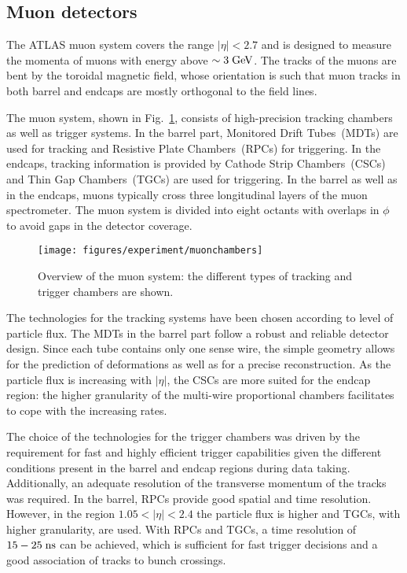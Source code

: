 \subsection{Muon detectors}
\label{sec:muonspectrometer}

The ATLAS muon system covers the range \mbox{$|\eta| < 2.7$}
and is designed to measure the momenta of muons with energy 
above \mbox{$\sim 3 \; \mathrm{GeV}$}.
The tracks of the muons are bent by the toroidal magnetic field,
whose orientation is such that muon tracks in both barrel and endcaps 
are mostly orthogonal to the field lines.

The muon system, shown in Fig.~\ref{fig:muons}, consists of high-precision tracking chambers as well as trigger systems.
In the barrel part, Monitored Drift Tubes~(MDTs) are used for tracking and Resistive Plate Chambers~(RPCs) for triggering.
In the endcaps, tracking information is provided by Cathode Strip Chambers~(CSCs) and Thin Gap Chambers~(TGCs) are used for triggering.
In the barrel as well as in the endcaps, muons typically cross three longitudinal layers of the muon spectrometer.
The muon system is divided into eight octants with overlaps in $\phi$ to avoid gaps in the detector coverage.

\begin{figure}[ht]
\begin{center}
\texttt{[image: figures/experiment/muonchambers]}
\caption[Overview of the muon system]{
  Overview of the muon system:
  the different types of tracking and trigger chambers are shown.}
\label{fig:muons}
\end{center}
\end{figure}

The technologies for the tracking systems have been chosen according to
level of particle flux.
The MDTs in the barrel part follow a robust and reliable detector design.
Since each tube contains only one sense wire, the simple geometry
allows for the prediction of deformations as well as for a precise reconstruction.
As the particle flux is increasing with $|\eta|$, 
the CSCs are more suited for the endcap region:
the higher granularity of the multi-wire proportional chambers 
facilitates to cope with the increasing rates.

The choice of the technologies for the trigger chambers was driven 
by the requirement for fast and highly efficient trigger capabilities
given the different conditions present in the barrel and endcap regions during data taking.
Additionally, an adequate resolution of the transverse momentum of the tracks was required.
In the barrel, RPCs provide good spatial and time resolution.
However, in the region \mbox{$1.05 < |\eta| < 2.4$}  the particle flux
is higher and TGCs, with higher granularity, are used.
With RPCs and TGCs, a time resolution of \mbox{$15 - 25 \; \mathrm{ns}$} can be
achieved, 
which is sufficient for fast trigger decisions and a good association of
tracks to bunch crossings.

